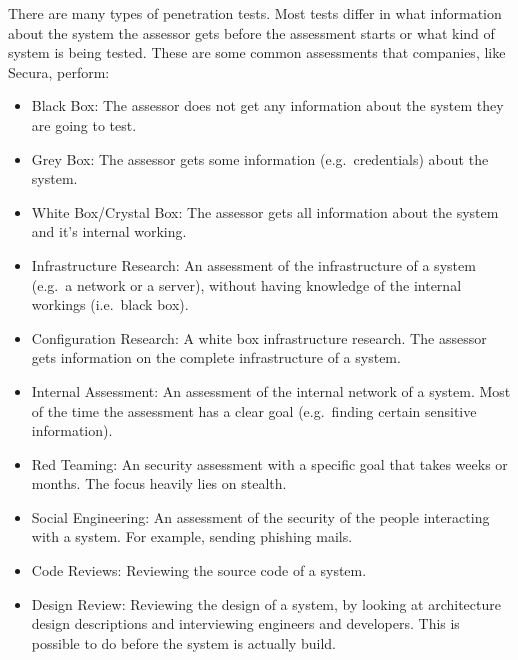 There are many types of penetration tests. Most tests differ in what information about the system the assessor gets before the assessment starts or what kind of system is being tested. These are some common assessments that companies, like Secura, perform:
\begin{itemize}
    \item Black Box: The assessor does not get any information about the system they are going to test.
    \item Grey Box: The assessor gets some information (e.g.\ credentials) about the system.
    \item White Box/Crystal Box:  The assessor gets all information about the system and it's internal working.
    \item Infrastructure Research: An assessment of the infrastructure of a system (e.g.\ a network or a server), without having knowledge of the internal workings (i.e.\ black box).
    \item Configuration Research: A white box infrastructure research. The assessor gets information on the complete infrastructure of a system.
    \item Internal Assessment: An assessment of the internal network of a system. Most of the time the assessment has a clear goal (e.g.\ finding certain sensitive information).
    \item Red Teaming: An security assessment with a specific goal that takes weeks or months. The focus heavily lies on stealth.
    \item Social Engineering: An assessment of the security of the people interacting with a system. For example, sending phishing mails.
    \item Code Reviews: Reviewing the source code of a system.
    \item Design Review: Reviewing the design of a system, by looking at architecture design descriptions and interviewing engineers and developers. This is possible to do before the system is actually build.
\end{itemize}
